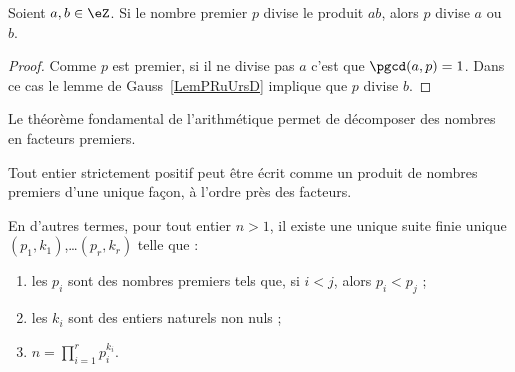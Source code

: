 \begin{lemma}       \label{LemAXINooOeuMJZ}
	Soient \( a,b\in \eZ\). Si le nombre premier \( p\) divise le produit \( ab\), alors \( p\) divise \( a\) ou \( b\).
\end{lemma}

\begin{proof}
	Comme \( p\) est premier, si il ne divise pas \( a\) c'est que \( \pgcd(a,p)=1\). Dans ce cas le lemme de Gauss~\ref{LemPRuUrsD} implique que \( p\) divise \( b\).
\end{proof}

Le théorème fondamental de l'arithmétique permet de décomposer des nombres en facteurs premiers.

\begin{theorem}        \label{ThoAJFJooAveRvY}
	Tout entier strictement positif peut être écrit comme un produit de nombres premiers d'une unique façon, à l'ordre près des facteurs.

	En d'autres termes, pour tout entier \( n>1\), il existe une unique suite finie unique \( (p_1, k_1)\),\ldots \( (p_r, k_r)\) telle que :
	\begin{enumerate}
		\item
		      les \( p_i\) sont des nombres premiers tels que, si \( i < j\), alors \( p_i < p_j\) ;
		\item
		      les \( k_i\) sont des entiers naturels non nuls ;
		\item
		      \( n=\prod_{i=1}^rp_i^{k_i}\).
	\end{enumerate}
\end{theorem}

